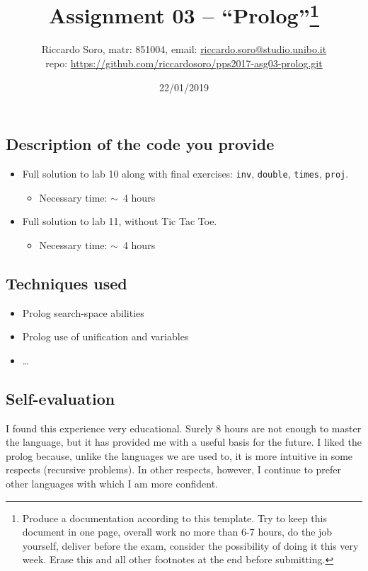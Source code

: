 \documentclass[
    a4paper,            %
    10pt,               %
    oneside,            %
    english]
    {article}
\title{\vspace{-70pt}Assignment 03 -- ``Prolog''\footnote{Produce a documentation according to this template. Try to keep this document in one page, overall work no more than 6-7 hours, do the job yourself, deliver before the exam, consider the possibility of doing it this very week. Erase this and all other footnotes at the end before submitting.}}
\author{Riccardo Soro, matr: 851004, email: {\url{riccardo.soro@studio.unibo.it}}\\ repo: \url{https://github.com/riccardosoro/pps2017-asg03-prolog.git}}
\date{22/01/2019}
\begin{document}
\maketitle
\vspace{-30pt}

\subsection*{Description of the code you provide}
 \begin{itemize}
            \item
                Full solution to lab 10 along with final exercises: \texttt{inv}, \texttt{double}, \texttt{times}, \texttt{proj}.
                \begin{itemize}
                    \item Necessary time: $\sim$~4 hours
                \end{itemize}

            \item
                Full solution to lab 11, without Tic Tac Toe.
                \begin{itemize}
                                       \item Necessary time: $\sim$~4 hours
                \end{itemize}
        \end{itemize}

\subsection*{Techniques used}

\begin{itemize}
 \item Prolog search-space abilities
 \item Prolog use of unification and variables
 \item \ldots
\end{itemize}

\subsection*{Self-evaluation}

I found this experience very educational.
Surely 8 hours are not enough to master the language, but it has provided me with a useful basis for the future.
I liked the prolog because, unlike the languages we are used to, it is more intuitive in some respects (recursive problems).
In other respects, however, I continue to prefer other languages with which I am more confident.
 
\end{document}
